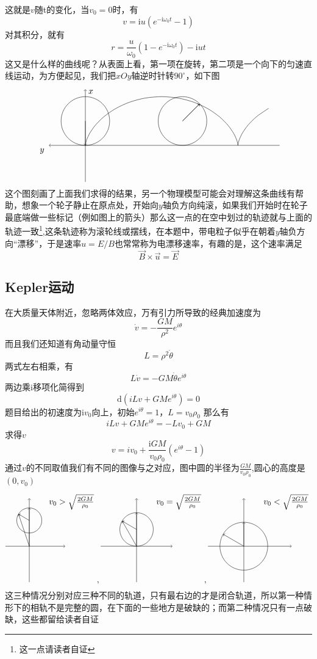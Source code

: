 \documentclass[UTF8]{ctexart}
\begin{document}
这就是\(v\)随t的变化，当\(v_0=0\)时，有
\[v=\mathrm{i} u(e^{-\mathrm{i} \omega_0 t}-1) \]
对其积分，就有
\[r = \frac{u}{\omega_0}(1-e^{-\mathrm{i} \omega_0 t})-\mathrm{i} ut\]
这又是什么样的曲线呢？从表面上看，第一项在旋转，第二项是一个向下的匀速直线运动，为方便起见，我们把\(xOy\)轴逆时针转$90^\circ$，如下图
\[
\begin{tikzpicture}
    \draw[->] (0,-1.5) -- (0,2.3);
    \draw[->] (8,0) -- (-1.5,0); 
    \draw (0,1) circle (1cm);
    \node[below right] (B) at (-2,0) {$y$};
    \node[above right] (C) at (0,2) {$x$};
    \draw[domain=0:8.4,smooth] plot({\x-sin(\x r)},{1-cos(\x r)});
    \draw (4,1) circle (1cm);
    \draw[->] (0,1) -- (0,0);
    \draw[->] (4,1) -- (4.7,1.7);
    \draw[->] (4,1) -- (4.7,1.7);
\end{tikzpicture}
\]
这个图刻画了上面我们求得的结果，另一个物理模型可能会对理解这条曲线有帮助，想象一个轮子静止在原点处，开始向\(y\)轴负方向纯滚，如果我们开始时在轮子最底端做一些标记（例如图上的箭头）那么这一点的在空中划过的轨迹就与上面的轨迹一致\footnote{这一点请读者自证},这条轨迹称为滚轮线或摆线，在本题中，带电粒子似乎在朝着\(y\)轴负方向“漂移”，于是速率\(u=E/B\)也常常称为电漂移速率，有趣的是，这个速率满足
\[\vec{B} \times \vec{u} = \vec{E}\]
\subsection{Kepler运动}
在大质量天体附近，忽略两体效应，万有引力所导致的经典加速度为
\[\dot{v}= -\frac{GM}{\rho^2}e^{i\theta}\]
而且我们还知道有角动量守恒
\[L = \rho^2 \dot{\theta}\]
两式左右相乘，有
\[L\dot{v}=-GM\dot{\theta}e^{i\theta}\]
两边乘\(\mathrm{i}\)移项化简得到
\[\mathrm{d}(iLv+GMe^{i\theta})=0\]
题目给出的初速度为\(\mathrm{i} v_0\)向上，初始\(e^{i\theta}=1\)，\(L=v_0\rho_0\)
那么有
\[iLv+GMe^{i\theta}=-Lv_0+GM\]
求得$v$
\[v=iv_0+\frac{\mathrm{i} GM}{v_0\rho_0}(e^{i\theta}-1)\]
通过$v$的不同取值我们有不同的图像与之对应，图中圆的半径为\(\frac{GM}{v_0\rho_0}\),圆心的高度是$(0,v_0)$
\[
\begin{tikzpicture}
    \draw[->] (-1,0) -- (1.5,0); 
    \draw[->] (0,-1.5) -- (0,2);
    \draw[->] (0,0) -- (0,1.6);
    \draw[->] (0,1.075) -- (-0.45,1.34);
    \draw[->] (0,0) -- (-0.45,1.34);
    \draw (0,1.075) circle (0.525cm);
    \node[above right] (C) at (0.7,1.4) {$v_0>\sqrt{\frac{2GM}{\rho_0}}$};
\end{tikzpicture},
\begin{tikzpicture}
    \draw[->] (-1.5,0) -- (1.5,0); 
    \draw[->] (0,-1.5) -- (0,2);
    \draw[->] (0,0) -- (0,1.4);
    \draw[->] (0,0.7) -- (-0.6,1.05);
    \draw[->] (0,0) -- (-0.6,1.05);
    \draw (0,0.7) circle (0.7cm);
    \node[above right] (C) at (0.7,1.4) {$v_0=\sqrt{\frac{2GM}{\rho_0}}$};
\end{tikzpicture},
\begin{tikzpicture}
    \draw[->] (-1.5,0) -- (2,0); 
    \draw[->] (0,-1.5) -- (0,2);
    \draw[->] (0,0) -- (0,1);
    \draw[->] (0,0) -- (150:1);
    \draw (0,0) circle (1cm);
    \node[above right] (C) at (0.7,1.4) {$v_0<\sqrt{\frac{2GM}{\rho_0}}$};
\end{tikzpicture}    
\]
这三种情况分别对应三种不同的轨道，只有最右边的才是闭合轨道，所以第一种情形下的相轨不是完整的圆，在下面的一些地方是破缺的；而第二种情况只有一点破缺，这些都留给读者自证
\end{document}

